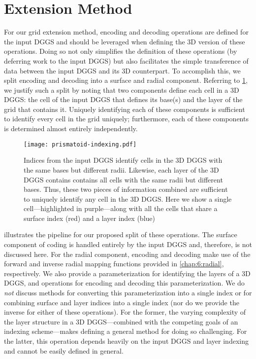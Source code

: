 \section{Extension Method} \label{chap:7:extension}
For our grid extension method, encoding and decoding operations are defined for the input DGGS and should be leveraged when defining the 3D version of these operations.
Doing so not only simplifies the definition of these operations (by deferring work to the input DGGS) but also facilitates the simple transference of data between the input DGGS and its 3D counterpart.
To accomplish this, we split encoding and decoding into a surface and radial component.
Referring to \cref{fig:prismatoid-indexing}, we justify such a split by noting that two components define each cell in a 3D DGGS: the cell of the input DGGS that defines its base(s) and the layer of the grid that contains it.
Uniquely identifying each of these components is sufficient to identify every cell in the grid uniquely; furthermore, each of these components is determined almost entirely independently.


\begin{figure}[htp!]
	\centering
	\texttt{[image: prismatoid-indexing.pdf]}
	\caption[Separation of surface and layer indices for the grid extension method]{
		Indices from the input DGGS identify cells in the 3D DGGS with the same bases but different radii.
		Likewise, each layer of the 3D DGGS contains contains all cells with the same radii but different bases.
		Thus, these two pieces of information combined are sufficient to uniquely identify any cell in the 3D DGGS.
		Here we show a single cell---highlighted in purple---along with all the cells that share a surface index (red) and a layer index (blue)
	}
	\label{fig:prismatoid-indexing}
\end{figure}


 illustrates the pipeline for our proposed split of these operations.
The surface component of coding is handled entirely by the input DGGS and, therefore, is not discussed here.
For the radial component, encoding and decoding make use of the forward and inverse radial mapping functions provided in \cref{chap:6:radial}, respectively.
We also provide a parameterization for identifying the layers of a 3D DGGS, and operations for encoding and decoding this parameterization.
We do \textit{not} discuss methods for converting this parameterization into a single index or for combining surface and layer indices into a single index (nor do we provide the inverse for either of these operations).
For the former, the varying complexity of the layer structure in a 3D DGGS---combined with the competing goals of an indexing scheme---makes defining a general method for doing so challenging.
For the latter, this operation depends heavily on the input DGGS and layer indexing and cannot be easily defined in general.


